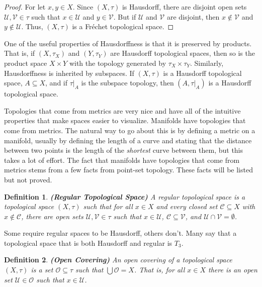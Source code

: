 \documentclass{article}
\theoremstyle{plain}
\theoremstyle{normal}
\newtheorem{definition}{Definition}[section]
\begin{document}
        \begin{proof}
            For let $x,y\in{X}$. Since $(X,\tau)$ is Hausdorff, there are
            disjoint open sets $\mathcal{U},\mathcal{V}\in\tau$ such that
            $x\in\mathcal{U}$ and $y\in\mathcal{V}$. But if $\mathcal{U}$ and
            $\mathcal{V}$ are disjoint, then $x\notin\mathcal{V}$ and
            $y\notin\mathcal{U}$. Thus, $(X,\tau)$ is a Fr\'{e}chet topological
            space.
        \end{proof}
        One of the useful properties of Hausdorffness is that it is preserved
        by products. That is, if $(X,\tau_{X})$ and $(Y,\tau_{Y})$ are
        Hausdorff topological spaces, then so is the product space
        $X\times{Y}$ with the topology generated by $\tau_{X}\times\tau_{Y}$.
        Similarly, Hausdorffness is inherited by subspaces. If
        $(X,\tau)$ is a Hausdorff topological space, $A\subseteq{X}$, and
        if $\tau|_{A}$ is the subspace topology, then
        $(A,\tau|_{A})$ is a Hausdorff topological space.
        \par\hfill\par
        Topologies that come from metrics are very nice and have all of the
        intuitive properties that make spaces easier to visualize. Manifolds
        have topologies that come from metrics. The natural way to go about this
        is by defining a metric on a manifold, usually by defining the length
        of a curve and stating that the distance between two points is the
        length of the \textit{shortest} curve between them, but this takes a lot
        of effort. The fact that manifolds have topologies that come from
        metrics stems from a few facts from point-set topology. These facts will
        be listed but not proved.
        \begin{definition}{\textbf{(Regular Topological Space)}}
            A regular topological space is a topological space $(X,\tau)$ such
            that for all $x\in{X}$ and every closed set
            $\mathcal{C}\subseteq{X}$ with $x\notin\mathcal{C}$, there are
            open sets $\mathcal{U},\mathcal{V}\in\tau$ such that
            $x\in\mathcal{U}$, $\mathcal{C}\subseteq\mathcal{V}$, and
            $\mathcal{U}\cap\mathcal{V}=\emptyset$.
        \end{definition}
        Some require regular spaces to be Hausdorff, others don't. Many say that
        a topological space that is both Hausdorff and regular is $T_{3}$.
        \begin{definition}{\textbf{(Open Covering)}}
            An open covering of a topological space $(X,\tau)$ is a set
            $\mathcal{O}\subseteq\tau$ such that $\bigcup\mathcal{O}=X$. That
            is, for all $x\in{X}$ there is an open set
            $\mathcal{U}\in\mathcal{O}$ such that $x\in\mathcal{U}$.
        \end{definition}
\end{document}
